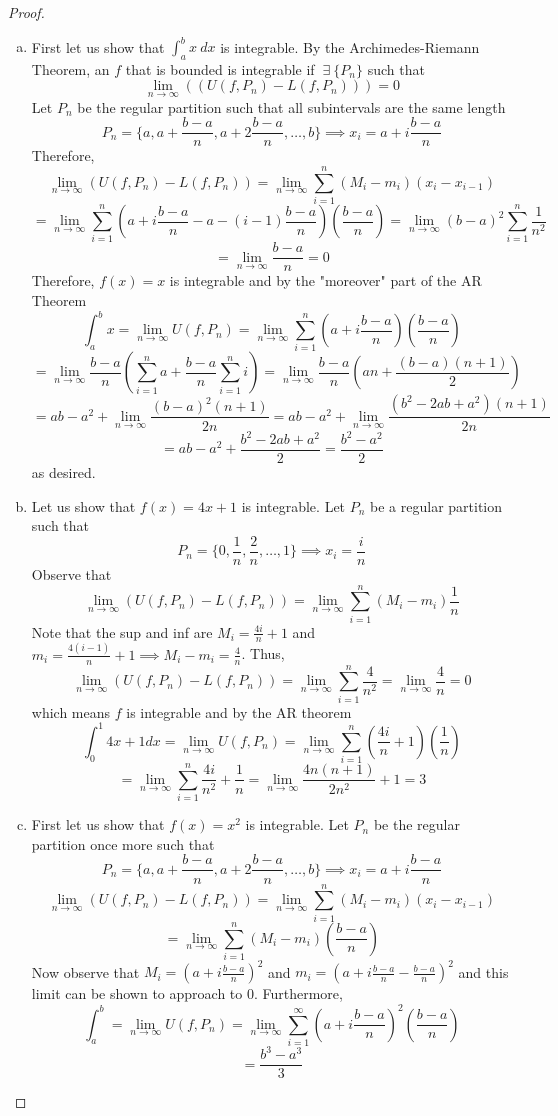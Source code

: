 \documentclass[12pt]{scrartcl}
\begin{document}
\begin{proof}

\hfill

\begin{enumerate}[a.]

\item First let us show that $\int_a^b x \ dx$ is integrable. By the Archimedes-Riemann Theorem, an $f$
that is bounded is integrable if $\ \exists \ \{P_n\}$ such that 
\[\lim_{n\to\infty}((U(f, P_n) - L(f, P_n))) = 0\]
Let $P_n$ be the regular partition such that all subintervals are the same length
\[P_n = \{a, a + \frac{b-a}{n}, a + 2\frac{b-a}{n}, \ldots, b\} \implies x_i = a + i\frac{b-a}{n}\]
Therefore, 
\[\lim_{n\to\infty}(U(f, P_n) - L(f, P_n)) = \lim_{n\to\infty} \sum_{i=1}^n (M_i - m_i)(x_i - x_{i-1})\]
\[= \lim_{n\to\infty}\sum_{i=1}^n (a + i\frac{b-a}{n} - a - (i-1)\frac{b-a}{n})(\frac{b-a}{n}) = \lim_{n\to\infty}(b-a)^2 \sum_{i=1}^n \frac{1}{n^2}\]
\[= \lim_{n\to\infty}\frac{b-a}{n} = 0\]
Therefore, $f(x) = x$ is integrable and by the "moreover" part of the AR Theorem
\[\int_a^b x = \lim_{n\to\infty}U(f, P_n) = \lim_{n\to\infty}\sum_{i=1}^n (a + i\frac{b-a}{n})(\frac{b-a}{n})\]
\[= \lim_{n\to\infty}\frac{b-a}{n}(\sum_{i=1}^n a + \frac{b-a}{n}\sum_{i=1}^n i) = \lim_{n\to\infty}\frac{b-a}{n} (an + \frac{(b-a)(n+1)}{2})\]
\[= ab-a^2 + \lim_{n\to\infty}\frac{(b-a)^2(n+1)}{2n} = ab - a^2 + \lim_{n\to\infty}\frac{(b^2 - 2ab + a^2)(n+1)}{2n}\]
\[ = ab - a^2 + \frac{b^2 - 2ab + a^2}{2} = \frac{b^2 - a^2}{2}\]
as desired.

\item Let us show that $f(x) = 4x + 1$ is integrable. Let $P_n$ be a regular partition such that 
\[P_n = \{0, \frac{1}{n}, \frac{2}{n}, \ldots, 1\} \implies x_i = \frac{i}{n}\]
Observe that 
\[\lim_{n\to\infty}(U(f, P_n) - L(f, P_n)) = \lim_{n\to\infty}\sum_{i=1}^n (M_i - m_i)\frac{1}{n}\]
Note that the sup and inf are $M_i = \frac{4i}{n} + 1$ and $m_i = \frac{4(i-1)}{n} + 1 \implies M_i - m_i = \frac{4}{n}$.
Thus, 
\[\lim_{n\to\infty}(U(f, P_n) - L(f, P_n)) = \lim_{n\to\infty}\sum_{i=1}^n \frac{4}{n^2} = \lim_{n\to\infty}\frac{4}{n} = 0\]
which means $f$ is integrable and by the AR theorem
\[\int_0^1 4x + 1 dx = \lim_{n\to\infty}U(f, P_n) = \lim_{n\to\infty}\sum_{i=1}^n (\frac{4i}{n} + 1)(\frac{1}{n})\]
\[= \lim_{n\to\infty}\sum_{i=1}^n \frac{4i}{n^2} + \frac{1}{n} = \lim_{n\to\infty}\frac{4n(n+1)}{2n^2} + 1 = 3\]

\item First let us show that $f(x) = x^2$ is integrable. Let $P_n$ be the regular partition once more 
such that 
\[P_n = \{a, a + \frac{b-a}{n}, a + 2\frac{b-a}{n}, \ldots, b\} \implies x_i = a + i\frac{b-a}{n}\]
\[\lim_{n\to\infty}(U(f, P_n) - L(f, P_n)) = \lim_{n\to\infty} \sum_{i=1}^n (M_i - m_i)(x_i - x_{i-1})\]
\[ = \lim_{n\to\infty}\sum_{i=1}^n (M_i - m_i)(\frac{b-a}{n})\]
Now observe that $M_i = (a + i\frac{b-a}{n})^2$ and $m_i = (a + i\frac{b-a}{n} - \frac{b-a}{n})^2$
and this limit can be shown to approach to 0.
Furthermore, 
\[\int_a^b = \lim_{n\to\infty}U(f, P_n) = \lim_{n\to\infty} \sum_{i=1}^\infty (a + i\frac{b-a}{n})^2(\frac{b-a}{n})\]
\[= \frac{b^3-a^3}{3}\]


\end{enumerate}
\end{proof}
\end{document}
